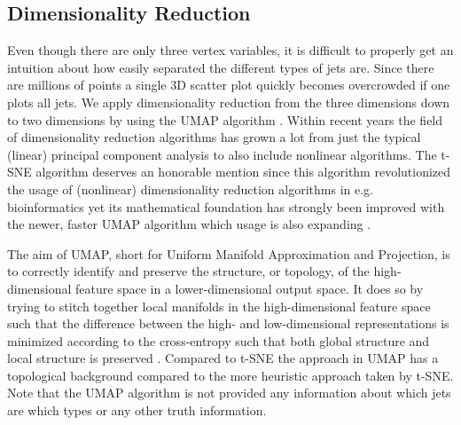 \FloatBarrier
\subsection{Dimensionality Reduction}

Even though there are only three vertex variables, it is difficult to properly get an intuition about how easily separated the different types of jets are. Since there are millions of points a single 3D scatter plot quickly becomes overcrowded if one plots all jets. We apply dimensionality reduction from the three dimensions down to two dimensions by using the UMAP algorithm \autocite{mcinnesUMAPUniformManifold2018}. Within recent years the field of dimensionality reduction algorithms has grown a lot from just the typical (linear) principal component analysis to also include nonlinear algorithms. The t-SNE algorithm \autocite{maatenVisualizingDataUsing2008} deserves an honorable mention since this algorithm revolutionized the usage of (nonlinear) dimensionality reduction algorithms in e.g. bioinformatics \citep{toghieshghiQuantitativeComparisonConventional2019, wallachProteinSmallmoleculeDatabase2009}  yet its mathematical foundation has strongly been improved with the newer, faster UMAP algorithm \autocite{mcinnesUMAPUniformManifold2018} which usage is also expanding \citep{bechtEvaluationUMAPAlternative2018, bechtDimensionalityReductionVisualizing2019, diaz-papkovichUMAPRevealsCryptic2019}.

The aim of UMAP, short for Uniform Manifold Approximation and Projection, is to correctly identify and preserve the structure, or topology, of the high-dimensional feature space in a lower-dimensional output space. It does so by trying to stitch together local manifolds in the high-dimensional feature space such that the difference between the high- and low-dimensional representations is minimized according to the cross-entropy such that both global structure and local structure is preserved \citep{mcinnesUMAPUniformManifold2018}. Compared to t-SNE the approach in UMAP has a topological background compared to the more heuristic approach taken by t-SNE. Note that the UMAP algorithm is not provided any information about which jets are which types or any other truth information. 

